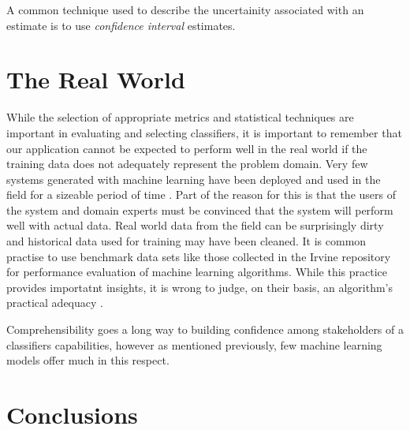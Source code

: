 \documentclass[10pt]{unbthesis}
\begin{document}
A common technique used to describe the uncertainity associated with
an estimate is to use \textit{confidence interval} estimates.


\section{The Real World}
While the selection of appropriate metrics and statistical techniques
are important in evaluating and selecting classifiers, it is important
to remember that our application cannot be expected to perform well in
the real world if the training data does not adequately represent the
problem domain. Very few systems generated with machine learning have
been deployed and used in the field for a sizeable period of time
\cite{RefWorks:46}. Part of the reason for this is that the users of
the system and domain experts must be convinced that the system will
perform well with actual data. Real world data from the field can be
surprisingly dirty \cite{RefWorks:58} and historical data used for
training may have been cleaned. It is common practise to use benchmark
data sets like those collected in the Irvine repository
\cite{RefWorks:59} for performance evaluation of machine learning
algorithms. While this practice provides importatnt insights, it is
wrong to judge, on their basis, an algorithm's practical adequacy
\cite{RefWorks:46}.

Comprehensibility goes a long way to building confidence among
stakeholders of a classifiers capabilities, however as mentioned
previously, few machine learning models offer much in this respect.

\section{Conclusions}


\renewcommand{\bibname}{References}



\end{document}

